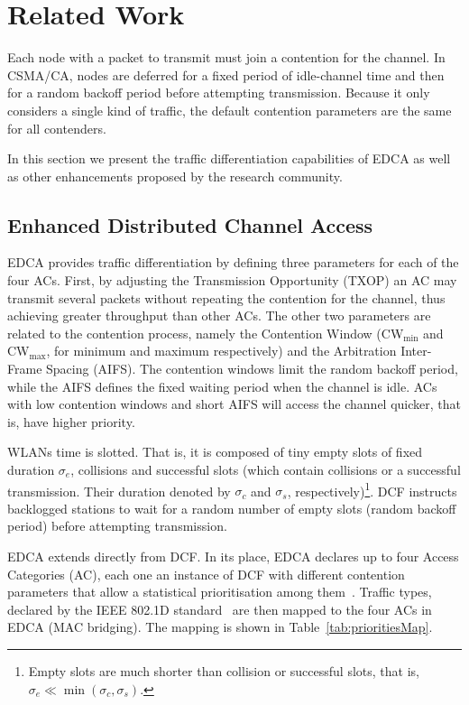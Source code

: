 \section{Related Work}\label{section2}
Each node with a packet to transmit must join a contention for the channel. In CSMA/CA, nodes are deferred for a fixed period of idle-channel time and then for a random backoff period before attempting transmission. Because it only considers a single kind of traffic, the default contention parameters are the same for all contenders. 

In this section we present the traffic differentiation capabilities of EDCA as well as other enhancements proposed by the research community.

\subsection{Enhanced Distributed Channel Access}\label{EDCA}
EDCA provides traffic differentiation by defining three parameters for each of the four ACs. First, by adjusting the Transmission Opportunity (TXOP) an AC may transmit several packets without repeating the contention for the channel, thus achieving greater throughput than other ACs. The other two parameters are related to the contention process, namely the Contention Window (CW$_{\min}$ and CW$_{\max}$, for minimum and maximum respectively) and the Arbitration Inter-Frame Spacing (AIFS). The contention windows limit the random backoff period, while the AIFS defines the fixed waiting period when the channel is idle. ACs with low contention windows and short AIFS will access the channel quicker, that is, have higher priority.

WLANs time is slotted. That is, it is composed of tiny empty slots of fixed duration $\sigma_{e}$, collisions and successful slots (which contain collisions or a successful transmission. Their duration denoted by $\sigma_{c}$ and $\sigma_{s}$, respectively)\footnote{Empty slots are much shorter than collision or successful slots, that is, $\sigma_{e}\ll\min(\sigma_{c},\sigma_{s})$.}. DCF instructs backlogged stations to wait for a random number of empty slots (random backoff period) before attempting transmission.

EDCA extends directly from DCF. In its place, EDCA declares up to four Access Categories (AC), each one an instance of DCF with different contention parameters that allow a statistical prioritisation among them~\cite{perahia2013next}. Traffic types, declared by the IEEE 802.1D standard~\cite{8021d} are then mapped to the four ACs in EDCA (MAC bridging). The mapping is shown in Table~\ref{tab:prioritiesMap}.

